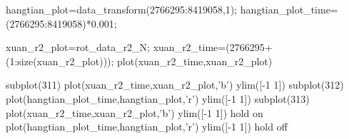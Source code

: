 hangtian_plot=data_transform(2766295:8419058,1);
hangtian_plot_time=(2766295:8419058)*0.001;

xuan_r2_plot=rot_data_r2_N;
xuan_r2_time=(2766295+(1:size(xuan_r2_plot)));
plot(xuan_r2_time,xuan_r2_plot)



subplot(311)
plot(xuan_r2_time,xuan_r2_plot,'b')
ylim([-1 1])
subplot(312)
plot(hangtian_plot_time,hangtian_plot,'r')
ylim([-1 1])
subplot(313)
plot(xuan_r2_time,xuan_r2_plot,'b')
ylim([-1 1])
hold on
plot(hangtian_plot_time,hangtian_plot,'r')
ylim([-1 1])
hold off